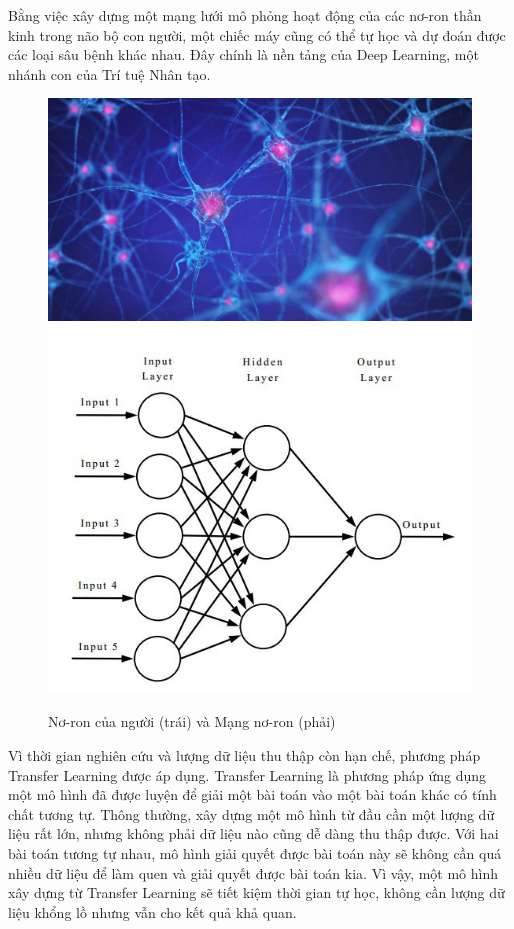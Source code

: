 \documentclass[a4paper,14pt]{extarticle}
\begin{document}
	Bằng việc xây dựng một mạng lưới mô phỏng hoạt động của các nơ-ron thần kinh trong não bộ con người, một chiếc máy cũng có thể tự học và dự đoán được các loại sâu bệnh khác nhau. Đây chính là nền tảng của Deep Learning, một nhánh con của Trí tuệ Nhân tạo.

	\begin{figure}[H]
		\centering
		\includegraphics[scale=0.8]{images/image10}
		\includegraphics[scale=0.3]{images/image15}
		\caption{Nơ-ron của người (trái) và Mạng nơ-ron (phải)}
	\end{figure}

	Vì thời gian nghiên cứu và lượng dữ liệu thu thập còn hạn chế, phương pháp Transfer Learning được áp dụng. Transfer Learning là phương pháp ứng dụng một mô hình đã được luyện để giải một bài toán vào một bài toán khác có tính chất tương tự. Thông thường, xây dựng một mô hình từ đầu cần một lượng dữ liệu rất lớn, nhưng không phải dữ liệu nào cũng dễ dàng thu thập được. Với hai bài toán tương tự nhau, mô hình giải quyết được bài toán này sẽ không cần quá nhiều dữ liệu để làm quen và giải quyết được bài toán kia. Vì vậy, một mô hình xây dựng từ Transfer Learning sẽ tiết kiệm thời gian tự học, không cần lượng dữ liệu khổng lồ nhưng vẫn cho kết quả khả quan.
\end{document}
